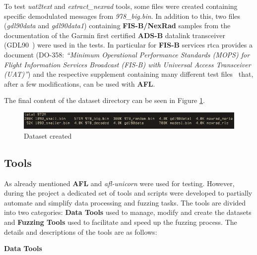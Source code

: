\documentclass[../main.tex]{subfiles}
\begin{document}
To test \textit{uat2text} and \textit{extract\_nexrad} tools, some files were
created containing specific demodulated messages from \textit{978\_big.bin}. In
addition to this, two files (\textit{gdl90data} and \textit{gdl90data1})
containing \textbf{FIS-B/NexRad} samples from the documentation of the Garmin
first certified \textbf{ADS-B} datalink transceiver (GDL90~\cite{gdl90}) were
used in the tests. In particular for \textbf{FIS-B} services \acrshort{rtca}
provides a document (DO-358: \emph{``Minimum Operational Performance Standards
(MOPS) for Flight Information Services Broadcast (FIS-B) with Universal Access
Transceiver (UAT)''}) and the respective supplement containing many different
test files~\cite{do358} that, after a few modifications, can be used with
\textbf{AFL}.

The final content of the dataset directory can be seen in Figure \ref{fig:dataset}.

\begin{figure}[htp]
  \centering
  \includegraphics[scale=0.74]{images/dataset.png}
  \caption{Dataset created}
  \label{fig:dataset}
\end{figure}

\subsection{Tools}
\label{sec:tools}

As already mentioned \textbf{AFL} and \textit{afl-unicorn} were used for testing. However, during the project a dedicated set of tools and scripts were developed to partially automate and simplify data processing and fuzzing tasks.
The tools are divided into two categories: \textbf{Data Tools} used to manage, modify and create the datasets and \textbf{Fuzzing Tools} used to facilitate and speed up the fuzzing process. The details and descriptions of the tools are as follows:
\bigskip

\textbf{Data Tools}
\end{document}
